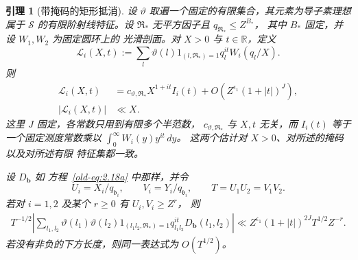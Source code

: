 \documentclass[11pt,a4paper]{article}
\numberwithin{equation}{section}
\numberwithin{figure}{section}
\newtheorem{lemma}[theorem]{引理}
\theoremstyle{definition}
\theoremstyle{remark}
\begin{document}
\begin{lemma}[带掩码的矩形抵消]
\label{lem:centered-lattice-cancellation}
设 \(\vartheta\) 取遍一个固定的有限集合，其元素为导子素理想
属于 \(\mathcal S\) 的有限阶射线特征。设
\(\mathfrak R_*\) 无平方因子且 \(q_{\mathfrak R_*}\le Z^{B_*}\)，
其中 \(B_*\) 固定，并设 \(W_1,W_2\) 为固定圆环上的
光滑剖面。对 \(X>0\) 与 \(t\in\mathbb R\)，定义
\[
 \mathcal L_i(X,t):=
 \sum_l\vartheta(l)1_{(l,\mathfrak R_*)=1}
           q_l^{it}W_i(q_l/X).
\]
则
\begin{align}
 \mathcal L_i(X,t)
 &=c_{\vartheta,\mathfrak R_*}X^{1+it}I_i(t)
   +O\left(Z^{\epsilon_1}(1+|t|)^J\right),
 \label{old-eq:2.18d}\\
 |\mathcal L_i(X,t)|&\ll X.
 \label{old-eq:2.18e}
\end{align}
这里 \(J\) 固定，各常数只用到有限多个半范数，
\(c_{\vartheta,\mathfrak R_*}\) 与 \(X,t\) 无关，而
\(I_i(t)\) 等于一个固定测度常数乘以
\(\int_0^\infty W_i(y)y^{it}\,dy\)。
这两个估计对 \(X>0\)、对所述的掩码以及对所述有限
特征集都一致。

设 \(D_{\mathbf b}\) 如
方程~\eqref{old-eq:2.18a} 中那样，并令
\[
 U_i=X_i/q_{\mathfrak b_i},\qquad
 V_i=Y_i/q_{\mathfrak b_i},\qquad
 T=U_1U_2=V_1V_2.
\]
若对 \(i=1,2\) 及某个 \(r\ge0\) 有 \(U_i,V_i\ge Z^r\)，
则
\begin{equation}
 \begin{split}
 T^{-1/2}\left|
 \sum_{l_1,l_2}
 \vartheta(l_1)\vartheta(l_2)
 1_{(l_1l_2,\mathfrak R_*)=1}
 q_{l_1l_2}^{it}D_{\mathbf b}(l_1,l_2)
 \right|
 \ll Z^{\epsilon_1}(1+|t|)^{2J}T^{1/2}Z^{-r}.
 \end{split}
 \label{old-eq:2.18f}
\end{equation}
若没有非负的下方长度，则同一表达式为
\(O(T^{1/2})\)。
\end{lemma}
\end{document}
